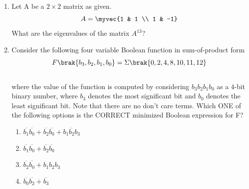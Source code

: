 \documentclass[a4paper, 11pt]{article}
\begin{document}
\begin{enumerate}
    \begin{enumerate}
    \end{enumerate}

    \hfill{}

    \item Let A be a $2 \times 2$ matrix as given.
    \[ A = \myvec{1 & 1 \\ 1 & -1} \]
    What are the eigenvalues of the matrix $A^{13}$?
    \begin{enumerate}
    \end{enumerate}

    \hfill{}

    \item Consider the following four variable Boolean function in sum-of-product form
    \[ F\brak{b_3, b_2, b_1, b_0} = \Sigma\brak{0,2,4,8,10,11,12} \]\\where the value of the function is computed by considering $b_3 b_2 b_1 b_0$ as a $4$-bit binary number, where $b_3$ denotes the most significant bit and $b_0$ denotes the least significant bit. Note that there are no don't care terms. Which ONE of the following options is the CORRECT minimized Boolean expression for F?
    \begin{enumerate}
        \item $\overline{b_1}\overline{b_0} + \overline{b_2}\overline{b_0} + b_1\overline{b_2}b_3$
        \item $\overline{b_1}\overline{b_0} + \overline{b_2}\overline{b_0}$
        \item $\overline{b_2}\overline{b_0} + b_1 b_2 b_3$
        \item $\overline{b_0}\overline{b_2} + \overline{b_3}$
    \end{enumerate}


\end{enumerate}
\end{document}
